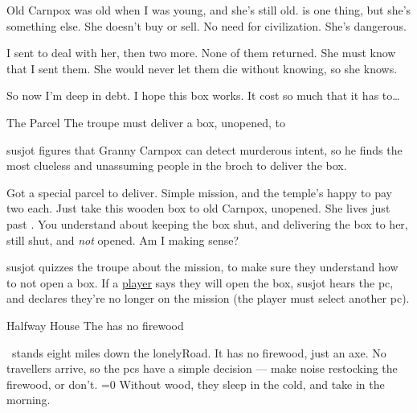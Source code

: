 \documentclass[10pt,twoside]{book}
\newcommand\carnBothy{}
\begin{document}




\begin{speechtext}

  Old Carnpox was old when I was young, and she's still old.
   is one thing, but she's something else.
  She doesn't buy or sell.
  No need for civilization.
  She's dangerous.

  I sent  to deal with her, then two more.
  None of them returned.
  She must know that I sent them.
  She would never let them die without knowing, so she knows.

  So now I'm deep in debt.
  I hope this box works.
  It cost so much that it has to\ldots

\end{speechtext}

{The Parcel}%
{The troupe must deliver a box, unopened, to }%

\pagestyle{minizine}%

\Gls{susjot} figures that Granny Carnpox can detect murderous intent, so he finds the most clueless and unassuming people in the \gls{broch} to deliver the box.

\begin{speechtext}
  Got a special parcel to deliver.
  Simple mission, and the temple's happy to pay two  each.
  Just take this wooden box to old Carnpox, unopened.
  She lives just past \carnBothy.
  You understand about keeping the box shut, and delivering the box to her, still shut, and \emph{not} opened.
  Am I making sense?
\end{speechtext}

\Gls{susjot} quizzes the troupe about the mission, to make sure they understand how to not open a box.
If a \underline{player} says they will open the box, \gls{susjot} hears the \gls{pc}, and declares they're no longer on the mission
(the player must select another \gls{pc}).

{Halfway House}%
{The  has no firewood}%

\carnBothy\ stands eight miles down the \gls{lonelyRoad}.
It has no firewood, just an axe.
No travellers arrive, so the \glspl{pc} have a simple decision --- make noise restocking the firewood, or don't.
\ifnum\value{temperature}=0
  Without wood, they sleep in the cold, and take  in the morning.
\fi
\end{document}
